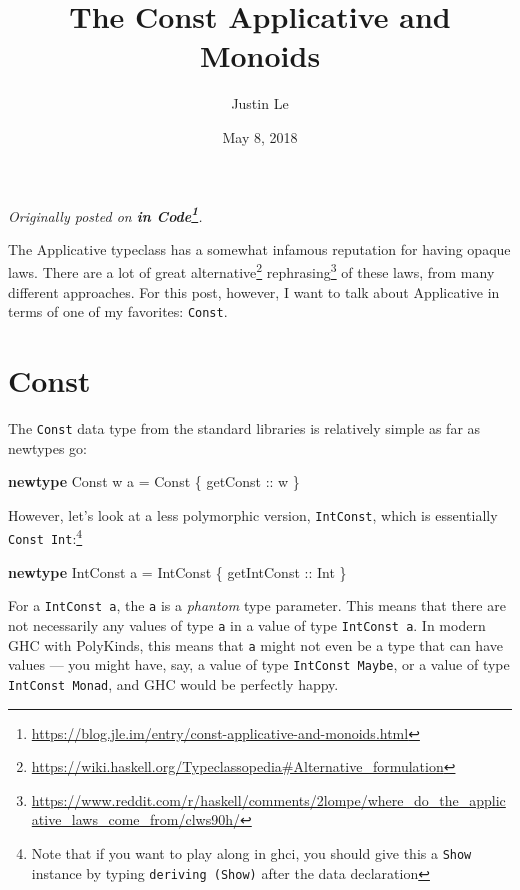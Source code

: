 \documentclass[]{article}
\title{The Const Applicative and Monoids}
\author{Justin Le}
\date{May 8, 2018}
\newenvironment{Shaded}{}{}
\newcommand{\DataTypeTok}[1]{\textcolor[rgb]{0.56,0.13,0.00}{#1}}
\newcommand{\KeywordTok}[1]{\textcolor[rgb]{0.00,0.44,0.13}{\textbf{#1}}}
\newcommand{\NormalTok}[1]{#1}
\newcommand{\OtherTok}[1]{\textcolor[rgb]{0.00,0.44,0.13}{#1}}
\renewcommand{\href}[2]{#2\footnote{\url{#1}}}
\begin{document}
\maketitle

\emph{Originally posted on
\textbf{\href{https://blog.jle.im/entry/const-applicative-and-monoids.html}{in
Code}}.}

The Applicative typeclass has a somewhat infamous reputation for having opaque
laws. There are a lot of great
\href{https://wiki.haskell.org/Typeclassopedia\#Alternative_formulation}{alternative}
\href{https://www.reddit.com/r/haskell/comments/2lompe/where_do_the_applicative_laws_come_from/clws90h/}{rephrasing}
of these laws, from many different approaches. For this post, however, I want to
talk about Applicative in terms of one of my favorites: \texttt{Const}.

\hypertarget{const}{%
\section{Const}\label{const}}

The \texttt{Const} data type from the standard libraries is relatively simple as
far as newtypes go:

\begin{Shaded}
\begin{Highlighting}[]
\KeywordTok{newtype} \DataTypeTok{Const}\NormalTok{ w a }\OtherTok{=} \DataTypeTok{Const}\NormalTok{ \{}\OtherTok{ getConst ::}\NormalTok{ w \}}
\end{Highlighting}
\end{Shaded}

However, let's look at a less polymorphic version, \texttt{IntConst}, which is
essentially \texttt{Const\ Int}:\footnote{Note that if you want to play along in
  ghci, you should give this a \texttt{Show} instance by typing
  \texttt{deriving\ (Show)} after the data declaration}

\begin{Shaded}
\begin{Highlighting}[]
\KeywordTok{newtype} \DataTypeTok{IntConst}\NormalTok{ a }\OtherTok{=} \DataTypeTok{IntConst}\NormalTok{ \{}\OtherTok{ getIntConst ::} \DataTypeTok{Int}\NormalTok{ \}}
\end{Highlighting}
\end{Shaded}

For a \texttt{IntConst\ a}, the \texttt{a} is a \emph{phantom} type parameter.
This means that there are not necessarily any values of type \texttt{a} in a
value of type \texttt{IntConst\ a}. In modern GHC with PolyKinds, this means
that \texttt{a} might not even be a type that can have values --- you might
have, say, a value of type \texttt{IntConst\ Maybe}, or a value of type
\texttt{IntConst\ Monad}, and GHC would be perfectly happy.
\end{document}
